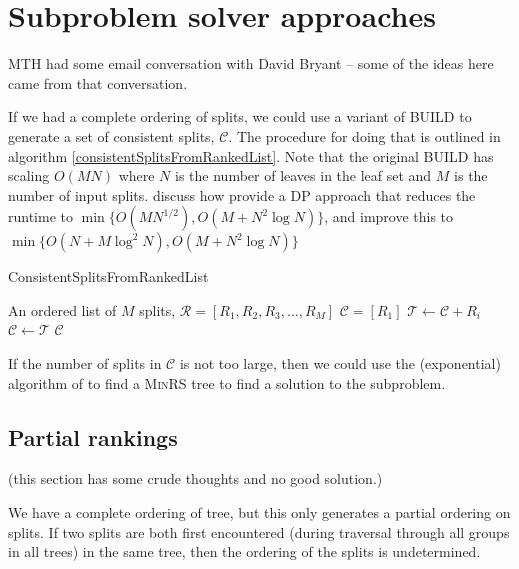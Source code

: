 \documentclass[11pt]{article}
\begin{document}
\section{Subproblem solver approaches}\label{subproblemSolver}
MTH had some email conversation with David Bryant -- some of the ideas here came from 
    that conversation.

If we had a complete ordering of splits, we could use a variant of \textsc{BUILD} \citep{AhoSSU1981}
to generate a set of consistent splits, $\mathcal{C}$.
The procedure for doing that is outlined in algorithm \ref{consistentSplitsFromRankedList}.
Note that the original BUILD has scaling $O(MN)$ where $N$ is the number of leaves in the leaf set
    and $M$ is the number of input splits.
\citet{JanssonLL2012} discuss how \citet{HenzingerKW1999} provide a DP approach that 
    reduces the runtime to $\min\{O(MN^{1/2}), O(M + N^2 \log N)\}$, and 
    \citet{HolmLT2001} improve this to $\min\{O(N + M\log^2 N), O(M + N^2 \log N)\}$

\begin{algorithm}
    \caption{ConsistentSplitsFromRankedList}\label{consistentSplitsFromRankedList}
\begin{algorithmic}
\REQUIRE An ordered list of $M$ splits, $\mathcal{R} = [R_1, R_2, R_3, \ldots, R_M]$
\STATE $\mathcal{C} = [R_1]$
    \STATE $\mathcal{T} \leftarrow \mathcal{C} + R_i$ 
        \STATE $\mathcal{C} \leftarrow \mathcal{T}$
    \ENDIF
\ENDFOR
\RETURN $\mathcal{C}$
\end{algorithmic}
\end{algorithm}


If the number of splits in $\mathcal{C}$ is not too large, then we could use the (exponential) algorithm
    of \citet{JanssonLL2012} to find a \textsc{MinRS} tree to find a solution to the subproblem.

\subsection{Partial rankings}
(this section has some crude thoughts and no good solution.)

We have a complete ordering of tree, but this only generates a partial ordering on splits. 
If two splits are both first encountered (during traversal through all groups in all trees) 
    in the same tree, then the ordering of the splits is undetermined.
\end{document}
